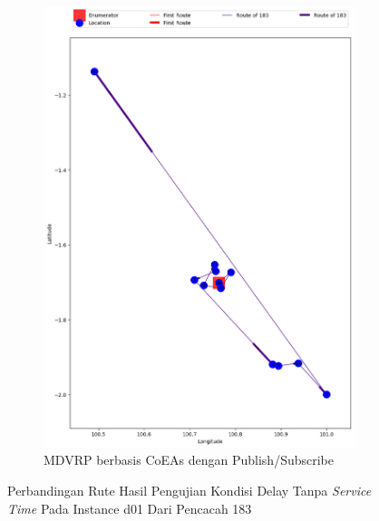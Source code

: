 \begin{figure}[H]\ContinuedFloat
	\centering
	\begin{subfigure}[t]{\textwidth}
		\centering
		\includegraphics[width=\textwidth]{Resources/Images/delayed_1/real_m15_n100_delayed_1_183_pubsub_coes}
		\caption{MDVRP berbasis CoEAs dengan Publish/Subscribe}
		\label{fig:real_m15_n100_delayed_1_183_pubsub_coes}
	\end{subfigure}
	\caption{Perbandingan Rute Hasil Pengujian Kondisi Delay Tanpa \textit{Service Time} Pada Instance d01 Dari Pencacah 183}
	\label{fig:real_m15_n100_delayed_1_183_contd}
\end{figure}


